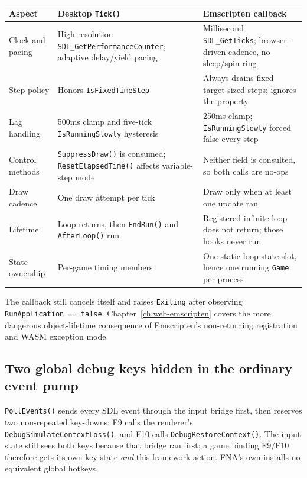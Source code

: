 \begin{center}
\small
\begin{tabularx}{\textwidth}{>{\raggedright\arraybackslash}p{}XX}
\toprule
Aspect & Desktop \texttt{Tick()} & Emscripten callback \\
\midrule
Clock and pacing & High-resolution \texttt{SDL\_GetPerformanceCounter}; adaptive delay/yield pacing & Millisecond \texttt{SDL\_GetTicks}; browser-driven cadence, no sleep/spin ring \\
Step policy & Honors \texttt{IsFixedTimeStep} & Always drains fixed target-sized steps; ignores the property \\
Lag handling & 500ms clamp and five-tick \texttt{IsRunningSlowly} hysteresis & 250ms clamp; \texttt{IsRunningSlowly} forced false every step \\
Control methods & \texttt{SuppressDraw()} is consumed; \texttt{ResetElapsedTime()} affects variable-step mode & Neither field is consulted, so both calls are no-ops \\
Draw cadence & One draw attempt per tick & Draw only when at least one update ran \\
Lifetime & Loop returns, then \texttt{EndRun()} and \texttt{AfterLoop()} run & Registered infinite loop does not return; those hooks never run \\
State ownership & Per-game timing members & One static loop-state slot, hence one running \texttt{Game} per process \\
\bottomrule
\end{tabularx}
\end{center}

The callback still cancels itself and raises \texttt{Exiting} after observing
\texttt{RunApplication == false}. Chapter~\ref{ch:web-emscripten} covers the more dangerous
object-lifetime consequence of Emscripten's non-returning registration and WASM exception mode.

\subsection{Two global debug keys hidden in the ordinary event pump}

\texttt{PollEvents()} sends every SDL event through the input bridge first, then reserves two
non-repeated key-downs: F9 calls the renderer's
\texttt{DebugSimulateContextLoss()}, and F10 calls \texttt{DebugRestoreContext()}. The input
state still sees both keys because that bridge ran first; a game binding F9/F10 therefore
gets its own key state \emph{and} this framework action. FNA's own  installs no
equivalent global hotkeys.

